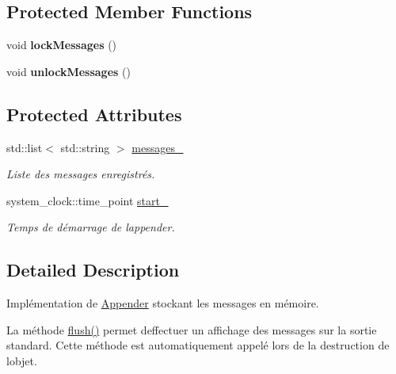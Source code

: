 \subsection*{Protected Member Functions}
\begin{DoxyCompactItemize}
\item 
\mbox{\label{classlogs_1_1MemoryAppender_a80be25f44b6b0f5b36e26442da0c85d2}} 
void {\bfseries lock\+Messages} ()
\item 
\mbox{\label{classlogs_1_1MemoryAppender_a60a0ea41d72e493005e1e7256920dd97}} 
void {\bfseries unlock\+Messages} ()
\end{DoxyCompactItemize}
\subsection*{Protected Attributes}
\begin{DoxyCompactItemize}
\item 
\mbox{\label{classlogs_1_1MemoryAppender_acfdadc58e747a97c2bb85ce72a79656d}} 
std\+::list$<$ std\+::string $>$ \hyperlink{classlogs_1_1MemoryAppender_acfdadc58e747a97c2bb85ce72a79656d}{messages\+\_\+}
\begin{DoxyCompactList}\small\item\em Liste des messages enregistrés. \end{DoxyCompactList}\item 
\mbox{\label{classlogs_1_1MemoryAppender_a7892adf078780d6ea1c4173f71f1749c}} 
system\+\_\+clock\+::time\+\_\+point \hyperlink{classlogs_1_1MemoryAppender_a7892adf078780d6ea1c4173f71f1749c}{start\+\_\+}
\begin{DoxyCompactList}\small\item\em Temps de démarrage de l\textquotesingle{}appender. \end{DoxyCompactList}\end{DoxyCompactItemize}


\subsection{Detailed Description}
Implémentation de \hyperlink{classlogs_1_1Appender}{Appender} stockant les messages en mémoire. 

La méthode \hyperlink{classlogs_1_1MemoryAppender_a90fd2058402bceaff5e896ceee438df4}{flush()} permet d\textquotesingle{}effectuer un affichage des messages sur la sortie standard. Cette méthode est automatiquement appelé lors de la destruction de l\textquotesingle{}objet. 

